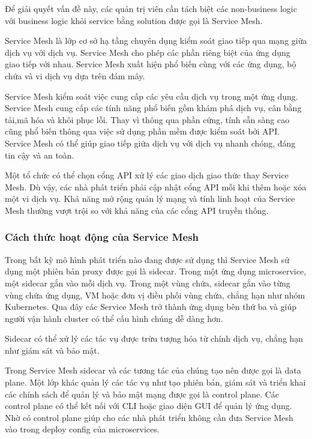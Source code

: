 \documentclass[14pt,a4paper]{book}
\begin{document}
		Để giải quyết vấn đề này, các quản trị viên cần tách biệt các non-business logic với business logic khỏi service bằng solution được gọi là Service Mesh.
		
		Service Mesh là lớp cơ sở hạ tầng chuyên dụng kiểm soát giao tiếp qua mạng giữa dịch vụ với dịch vụ. Service Mesh cho phép các phần riêng biệt của ứng dụng giao tiếp với nhau. Service Mesh xuất hiện phổ biến cùng với các ứng dụng, bộ chứa và vi dịch vụ dựa trên đám mây.
		
		Service Mesh kiểm soát việc cung cấp các yêu cầu dịch vụ trong một ứng dụng. Service Mesh cung cấp các tính năng phổ biến gồm khám phá dịch vụ, cân bằng tải,mã hóa và khôi phục lỗi. Thay vì thông qua phần cứng, tính sẵn sàng cao cũng phổ biến thông qua việc sử dụng phần mềm được kiểm soát bởi API. Service Mesh có thể giúp giao tiếp giữa dịch vụ với dịch vụ nhanh chóng, đáng tin cậy và an toàn.
		
		Một tổ chức có thể chọn cổng API xử lý các giao dịch giao thức thay Service Mesh. Dù vậy, các nhà phát triển phải cập nhật cổng API mỗi khi thêm hoặc xóa một vi dịch vụ. Khả năng mở rộng quản lý mạng và tính linh hoạt của Service Mesh thường vượt trội so với khả năng của các cổng API truyền thống.
		
		\subsubsection{Cách thức hoạt động của Service Mesh}
		\hspace{0.6cm}Trong bất kỳ mô hình phát triển nào đang được sử dụng thì Service Mesh sử dụng một phiên bản proxy được gọi là sidecar. Trong một ứng dụng microservice, một sidecar gắn vào mỗi dịch vụ. Trong một vùng chứa, sidecar gắn vào từng vùng chứa ứng dụng, VM hoặc đơn vị điều phối vùng chứa, chẳng hạn như nhóm Kubernetes. Qua đây các Service Mesh trở thành ứng dụng bên thứ ba và giúp người vận hành cluster có thể cấu hình chúng dễ dàng hơn.
		
		Sidecar có thể xử lý các tác vụ được trừu tượng hóa từ chính dịch vụ, chẳng hạn như giám sát và bảo mật.
		
		Trong Service Mesh sidecar và các tương tác của chúng tạo nên được gọi là data plane. Một lớp khác quản lý các tác vụ như tạo phiên bản, giám sát và triển khai các chính sách để quản lý và bảo mật mạng được gọi là control plane. Các control plane có thể kết nối với CLI hoặc giao diện GUI để quản lý ứng dụng. Nhờ có control plane giúp cho các nhà phát triển không cần đưa Service Mesh vào trong deploy config của microservices.
		
\end{document}
